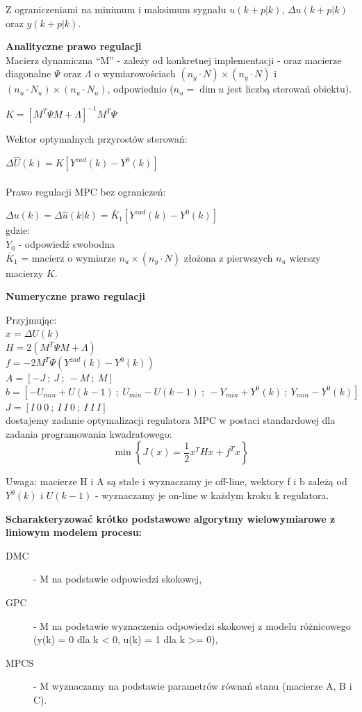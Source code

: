 Z ograniczeniami na minimum i maksimum sygnału $u(k+p|k)$, $\Delta u(k+p|k)$ oraz $y(k+p|k)$.

\textbf{Analityczne prawo regulacji}\\
Macierz dynamiczna “M” - zależy od konkretnej implementacji - oraz macierze diagonalne $\Psi$ oraz $\Lambda$ o wymiarowościach $(n_y\cdot N) \times (n_y\cdot N)$ i $(n_u\cdot N_u) \times (n_u\cdot N_u)$, odpowiednio ($n_u=\dim u$ jest liczbą sterowań obiektu).

$K = [M^T\Psi M + \Lambda]^{-1}M^T\Psi$

Wektor optymalnych przyrostów sterowań:

$\Delta \hat{U}(k) = K[Y^{zad}(k)-Y^0(k)]$
\\\\

Prawo regulacji MPC bez ograniczeń:

$\Delta u(k) =\Delta \hat{u}(k|k) = \bar{K}_1[Y^{zad}(k)-Y^0(k)]$\\
gdzie:\\
$Y_0$ - odpowiedź swobodna\\
$\bar{K}_1$ = macierz o wymiarze $n_u\times (n_y\cdot N)$ złożona z pierwszych $n_u$ wierszy macierzy $K$.

\textbf{Numeryczne prawo regulacji}

Przyjmując:\\
$x = \Delta U(k)$\\
$H = 2(M^T\Psi M + \Lambda)$\\
$f = -2M^T\Psi(Y^{zad}(k)-Y^0(k))$\\
$A = [-J\:;\:J\:;\:-M\:;\:M]$\\
$b = [-U_{min} + U(k-1)\:;\:U_{min} - U(k-1)\:;\:-Y_{min} + Y^0(k)\:;\:Y_{min} - Y^0(k)]$\\
$J = [I\:0\:0\:;\:I\:I\:0\:;\:I\:I\:I]$\\
dostajemy zadanie optymalizacji regulatora MPC w postaci standardowej dla zadania programowania kwadratowego:
\begin{equation}
    \min \left\{ J(x) = \frac{1}{2}x^THx+f^Tx\right\}
\end{equation}

Uwaga: macierze H i A są stałe i wyznaczamy je off-line, wektory f i b zależą od $Y^0(k)$ i $U(k-1)$ - wyznaczamy je on-line w każdym kroku k regulatora.

\textbf{Scharakteryzować krótko podstawowe algorytmy wielowymiarowe z liniowym modelem procesu:}
\begin{description}
    \item[DMC] - M na podstawie odpowiedzi skokowej,
    \item[GPC] - M na podstawie wyznaczenia odpowiedzi skokowej z modelu różnicowego (y(k) = 0 dla k < 0, u(k) = 1 dla k >= 0),
    \item[MPCS] - M wyznaczamy na podstawie parametrów równań stanu (macierze A, B i C).
\end{description}

